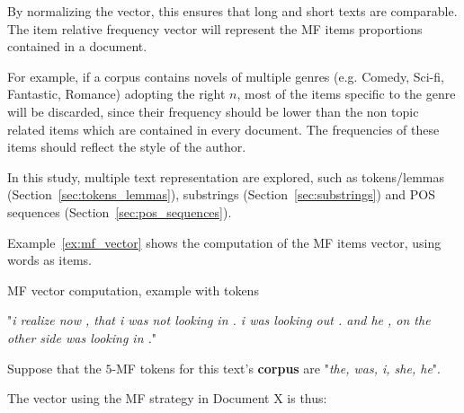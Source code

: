 By normalizing the vector, this ensures that long and short texts are comparable.
The item relative frequency vector will represent the MF items proportions contained in a document.

For example, if a corpus contains novels of multiple genres (e.g. Comedy, Sci-fi, Fantastic, Romance) adopting the right $n$, most of the items specific to the genre will be discarded, since their frequency should be lower than the non topic related items which are contained in every document.
The frequencies of these items should reflect the style of the author.

In this study, multiple text representation are explored, such as tokens/lemmas (Section~\ref{sec:tokens_lemmas}), substrings (Section~\ref{sec:substrings}) and POS sequences (Section~\ref{sec:pos_sequences}).

Example~\ref{ex:mf_vector} shows the computation of the MF items vector, using words as items.

\begin{example}[!t]
  \centering
  \caption{MF vector computation, example with tokens}
  \label{ex:mf_vector}

  \begin{subexample}{\linewidth}
    "\textit{i realize now , that i was not looking in . i was looking out . and he , on the other side was looking in .}"\cite{ddlc}
  \end{subexample}

  \vspace{0.5cm}

  \begin{subexample}{\linewidth}
    Suppose that the $5$-MF tokens for this text's \textbf{corpus} are "\textit{the, was, i, she, he}".

    The vector using the MF strategy in Document X is thus:
    \vspace{0.2cm}

    \centering
  \end{subexample}
\end{example}

